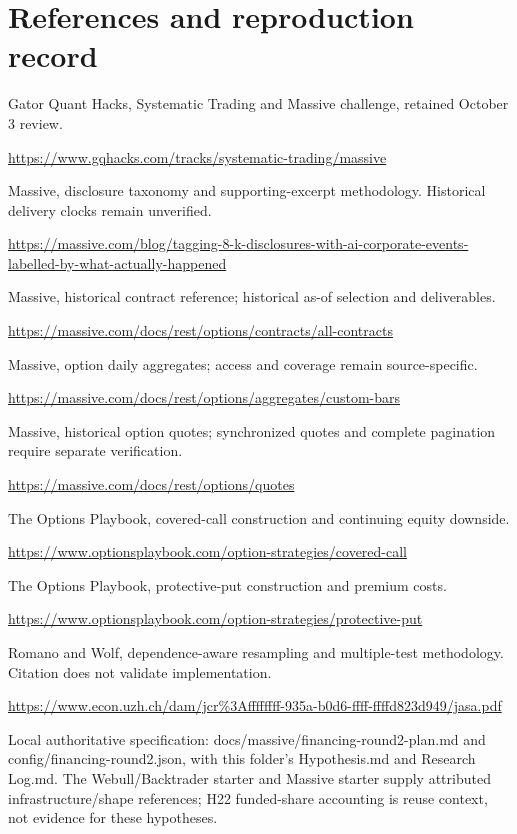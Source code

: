 \documentclass[11pt,letterpaper]{article}
\begin{document}
\section*{References and reproduction record}
Gator Quant Hacks, Systematic Trading and Massive challenge, retained October 3 review.\par\url{https://www.gqhacks.com/tracks/systematic-trading/massive}\par\medskip
Massive, disclosure taxonomy and supporting-excerpt methodology. Historical delivery clocks remain unverified.\par\url{https://massive.com/blog/tagging-8-k-disclosures-with-ai-corporate-events-labelled-by-what-actually-happened}\par\medskip
Massive, historical contract reference; historical as-of selection and deliverables.\par\url{https://massive.com/docs/rest/options/contracts/all-contracts}\par\medskip
Massive, option daily aggregates; access and coverage remain source-specific.\par\url{https://massive.com/docs/rest/options/aggregates/custom-bars}\par\medskip
Massive, historical option quotes; synchronized quotes and complete pagination require separate verification.\par\url{https://massive.com/docs/rest/options/quotes}\par\medskip
The Options Playbook, covered-call construction and continuing equity downside.\par\url{https://www.optionsplaybook.com/option-strategies/covered-call}\par\medskip
The Options Playbook, protective-put construction and premium costs.\par\url{https://www.optionsplaybook.com/option-strategies/protective-put}\par\medskip
Romano and Wolf, dependence-aware resampling and multiple-test methodology. Citation does not validate implementation.\par\url{https://www.econ.uzh.ch/dam/jcr%3Affffffff-935a-b0d6-ffff-ffffd823d949/jasa.pdf}\par\medskip
Local authoritative specification: docs/massive/financing-round2-plan.md and config/financing-round2.json, with this folder's Hypothesis.md and Research Log.md. The Webull/Backtrader starter and Massive starter supply attributed infrastructure/shape references; H22 funded-share accounting is reuse context, not evidence for these hypotheses.
\end{document}
